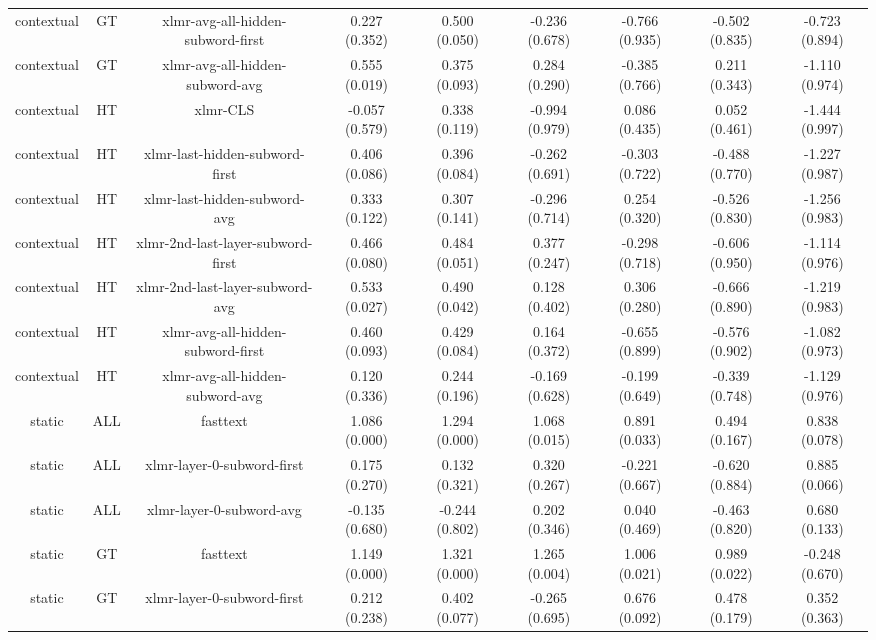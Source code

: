 \begin{sidewaystable}[htb]
\begin{tabular}{@{}ccccccccc@{}}
        contextual & GT & xlmr-avg-all-hidden-subword-first & 0.227 (0.352) & 0.500 (0.050) & -0.236 (0.678) & -0.766 (0.935) & -0.502 (0.835) & -0.723 (0.894) \\
        contextual & GT & xlmr-avg-all-hidden-subword-avg & 0.555 (0.019) & 0.375 (0.093) & 0.284 (0.290) & -0.385 (0.766) & 0.211 (0.343) & -1.110 (0.974) \\
        contextual & HT & xlmr-CLS & -0.057 (0.579) & 0.338 (0.119) & -0.994 (0.979) & 0.086 (0.435) & 0.052 (0.461) & -1.444 (0.997) \\
        contextual & HT & xlmr-last-hidden-subword-first & 0.406 (0.086) & 0.396 (0.084) & -0.262 (0.691) & -0.303 (0.722) & -0.488 (0.770) & -1.227 (0.987) \\
        contextual & HT & xlmr-last-hidden-subword-avg & 0.333 (0.122) & 0.307 (0.141) & -0.296 (0.714) & 0.254 (0.320) & -0.526 (0.830) & -1.256 (0.983) \\
        contextual & HT & xlmr-2nd-last-layer-subword-first & 0.466 (0.080) & 0.484 (0.051) & 0.377 (0.247) & -0.298 (0.718) & -0.606 (0.950) & -1.114 (0.976) \\
        contextual & HT & xlmr-2nd-last-layer-subword-avg & 0.533 (0.027) & 0.490 (0.042) & 0.128 (0.402) & 0.306 (0.280) & -0.666 (0.890) & -1.219 (0.983) \\
        contextual & HT & xlmr-avg-all-hidden-subword-first & 0.460 (0.093) & 0.429 (0.084) & 0.164 (0.372) & -0.655 (0.899) & -0.576 (0.902) & -1.082 (0.973) \\
        contextual & HT & xlmr-avg-all-hidden-subword-avg & 0.120 (0.336) & 0.244 (0.196) & -0.169 (0.628) & -0.199 (0.649) & -0.339 (0.748) & -1.129 (0.976) \\
        static & ALL & fasttext & 1.086 (0.000) & 1.294 (0.000) & 1.068 (0.015) & 0.891 (0.033) & 0.494 (0.167) & 0.838 (0.078) \\
        static & ALL & xlmr-layer-0-subword-first & 0.175 (0.270) & 0.132 (0.321) & 0.320 (0.267) & -0.221 (0.667) & -0.620 (0.884) & 0.885 (0.066) \\
        static & ALL & xlmr-layer-0-subword-avg & -0.135 (0.680) & -0.244 (0.802) & 0.202 (0.346) & 0.040 (0.469) & -0.463 (0.820) & 0.680 (0.133) \\
        static & GT & fasttext & 1.149 (0.000) & 1.321 (0.000) & 1.265 (0.004) & 1.006 (0.021) & 0.989 (0.022) & -0.248 (0.670) \\
        static & GT & xlmr-layer-0-subword-first & 0.212 (0.238) & 0.402 (0.077) & -0.265 (0.695) & 0.676 (0.092) & 0.478 (0.179) & 0.352 (0.363) \\

\end{tabular}
\end{sidewaystable}
